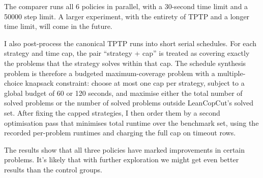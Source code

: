 \documentclass[11pt,twocolumn]{article}
\begin{document}
The comparer runs all 6 policies in parallel, with a 30-second time limit and a \num{50000} step limit.
A larger experiment, with the entirety of TPTP and a longer time limit, will come in the future.

I also post-process the canonical TPTP runs into short serial schedules.
For each strategy and time cap, the pair ``strategy + cap'' is treated as covering exactly the problems that the strategy solves within that cap.
The schedule synthesis problem is therefore a budgeted maximum-coverage problem with a multiple-choice knapsack constraint: choose at most one cap per strategy, subject to a global budget of 60 or 120 seconds, and maximise either the total number of solved problems or the number of solved problems outside LeanCopCut's solved set.
After fixing the capped strategies, I then order them by a second optimisation pass that minimises total runtime over the benchmark set, using the recorded per-problem runtimes and charging the full cap on timeout rows.

The results show that all three policies have marked improvements in certain problems.
It's likely that with further exploration we might get even better results than the control groups.

\vspace{-6pt}
\renewcommand*{\bibfont}{\tiny}
\vspace{-6pt}
\printbibliography{}
\end{document}
